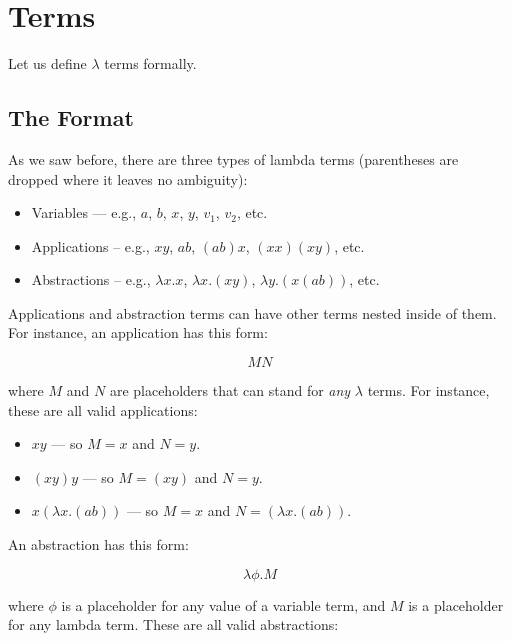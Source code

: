 \documentclass{book}
\numberwithin{equation}{chapter}
\begin{document}
\chapter{Terms}

Let us define $\lambda$ terms formally.


\section{The Format}

As we saw before, there are three types of lambda terms (parentheses are dropped where it leaves no ambiguity):

\begin{itemize}
\item{Variables --- e.g., $a$, $b$, $x$, $y$, $v_{1}$, $v_{2}$, etc.}
\item{Applications -- e.g., $xy$, $ab$, $(ab)x$, $(xx)(xy)$, etc.}
\item{Abstractions -- e.g., $\lambda x.x$, $\lambda x.(xy)$, $\lambda y.(x(ab))$, etc.}
\end{itemize}

\noindent
Applications and abstraction terms can have other terms nested inside of them. For instance, an application has this form:

\begin{equation}
MN
\end{equation}

\noindent
where $M$ and $N$ are placeholders that can stand for \textit{any} $\lambda$ terms. For instance, these are all valid applications:

\begin{itemize}
\item{$xy$ --- so $M = x$ and $N = y$.}
\item{$(xy)y$ --- so $M = (xy)$ and $N = y$.}
\item{$x(\lambda x.(ab))$ --- so $M = x$ and $N = (\lambda x.(ab))$.}
\end{itemize}

\noindent
An abstraction has this form:

\begin{equation}
\lambda \phi.M
\end{equation}

\noindent
where $\phi$ is a placeholder for any value of a variable term, and $M$ is a placeholder for any lambda term. These are all valid abstractions:
\end{document}
